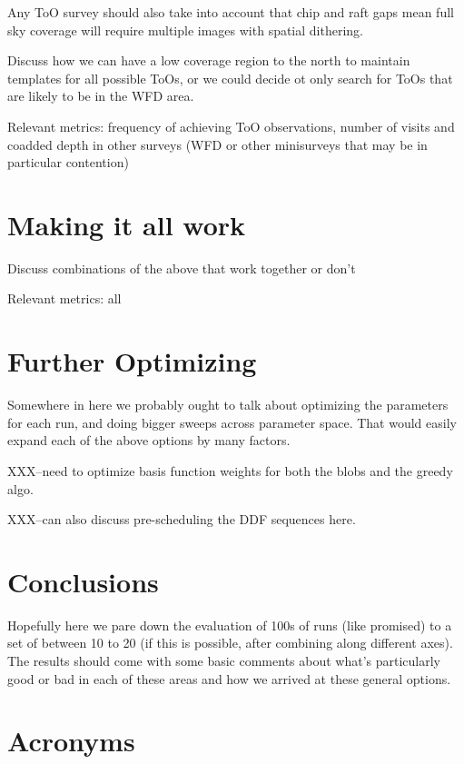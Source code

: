 Any ToO survey should also take into account that chip and raft gaps mean full sky coverage will require multiple images with spatial dithering.

Discuss how we can have a low coverage region to the north to maintain templates for all possible ToOs, or we could decide ot only search for ToOs that are likely to be in the WFD area.

Relevant metrics: frequency of achieving ToO observations, number of visits and coadded depth in other surveys (WFD or other minisurveys that may be in particular contention)

\section{Making it all work}
Discuss combinations of the above that work together or don't 

Relevant metrics: all

\section{Further Optimizing}
Somewhere in here we probably ought to talk about optimizing the parameters for each run, and doing bigger sweeps across parameter space. That would easily expand each of the above options by many factors.

XXX--need to optimize basis function weights for both the blobs and the greedy algo.

XXX--can also discuss pre-scheduling the DDF sequences here.

\section{Conclusions}
Hopefully here we pare down the evaluation of 100s of runs (like promised) to a set of between 10 to 20 (if this is possible, after combining along different axes). 
The results should come with some basic comments about what's particularly good or bad in each of these areas and how we arrived at these general options. 




\section{Acronyms} \label{sec:acronyms}


